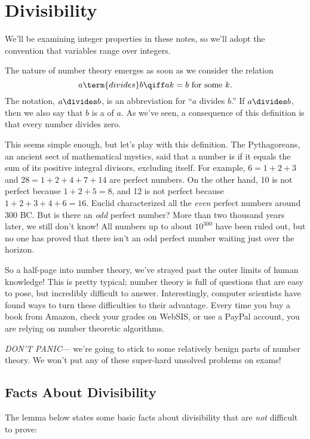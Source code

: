 \section{Divisibility}

We'll be examining integer properties in these notes, so we'll adopt the
convention that variables range over integers.

The nature of number theory emerges as soon as we consider the
 relation
\[
a \term{ divides } b \qiff ak = b \text{ for some } k.
\]
The notation, $a \divides b$, is an abbreviation for ``$a$ divides $b$.''
If $a \divides b$, then we also say that $b$ is a  of $a$.
As we've seen, a consequence of this definition is that every number
divides zero.

This seems simple enough, but let's play with this definition.  The
Pythagoreans, an ancient sect of mathematical mystics, said that a
number is  if it equals the sum of its positive
integral divisors, excluding itself.  For example, $6 = 1 + 2 + 3$
and $28 = 1 + 2 + 4 + 7 + 14$ are perfect numbers.  On the other hand,
10 is not perfect because $1 + 2 + 5 = 8$, and 12 is not perfect
because $1 + 2 + 3 + 4 + 6 = 16$.  Euclid characterized all the
\textit{even} perfect numbers around 300 BC.  But is there an
\textit{odd} perfect number?  More than two thousand years later, we
still don't know!  All numbers up to about $10^{300}$ have been ruled
out, but no one has proved that there isn't an odd perfect number
waiting just over the horizon.

So a half-page into number theory, we've strayed past the outer limits of
human knowledge!  This is pretty typical; number theory is full of
questions that are easy to pose, but incredibly difficult to answer.
Interestingly, computer scientists have found ways to turn these
difficulties to their advantage.  Every time you buy a book from Amazon,
check your grades on WebSIS, or use a PayPal account, you are relying on
number theoretic algorithms.

\textit{DON'T PANIC}--- we're going to stick to some relatively benign
parts of number theory.  We won't put any of these super-hard unsolved
problems on exams!

\subsection{Facts About Divisibility}

The lemma below states some basic facts about divisibility that are
\textit{not} difficult to prove:

